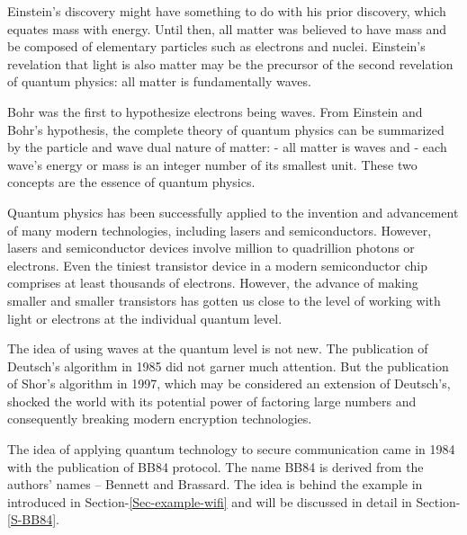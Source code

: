 \documentclass[oneside, letter, 12pt]{book}
\begin{document}
Einstein's discovery might have something to do with his prior discovery, which equates mass with energy. Until then, all matter was believed to have mass and be composed of elementary particles such as electrons and nuclei. Einstein's revelation that light is also matter may be the precursor of the second revelation of quantum physics: all matter is fundamentally waves.

Bohr was the first to hypothesize electrons being waves. From Einstein and Bohr's hypothesis, the complete theory of quantum physics can be summarized by the particle and wave dual nature of matter:
- all matter is waves and
- each wave's energy or mass is an integer number of its smallest unit.
These two concepts are the essence of quantum physics.

Quantum physics has been successfully applied to the invention and advancement of many modern technologies, including lasers and semiconductors. However, lasers and semiconductor devices involve million to quadrillion photons or electrons. Even the tiniest transistor device in a modern semiconductor chip comprises at least thousands of electrons. However, the advance of making smaller and smaller transistors has gotten us close to the level of working with light or electrons at the individual quantum level.

The idea of using waves at the quantum level is not new. The publication of Deutsch's algorithm\cite{1985Deutsch} in 1985 did not garner much attention. But the publication of Shor's algorithm in 1997, which may be considered an extension of Deutsch's, shocked the world with its potential power of factoring large numbers and consequently breaking modern encryption technologies.

The idea of applying quantum technology to secure communication came in 1984 with the publication of BB84 protocol\cite{1997Shor}. The name BB84 is derived from the authors' names -- Bennett and Brassard. The idea is behind the example in introduced in Section-\ref{Sec-example-wifi} and will be discussed in detail in Section-\ref{S-BB84}.
\end{document}
